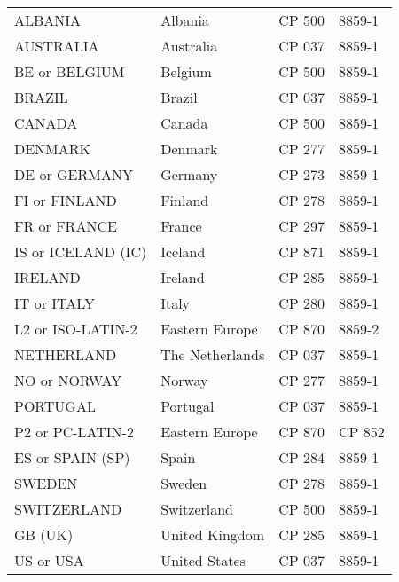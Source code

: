 \documentclass[letterpaper,10pt,english]{sphinxmanual}
\begin{document}
\begin{savenotes}\sphinxattablestart
\centering
\begin{tabulary}{\linewidth}[t]{|T|T|T|T|}
\hline
{}\relax &\relax &\relax &\relax \\
\hline
ALBANIA
&
Albania
&
CP 500
&
8859-1
\\
\hline
AUSTRALIA
&
Australia
&
CP 037
&
8859-1
\\
\hline
BE or BELGIUM
&
Belgium
&
CP 500
&
8859-1
\\
\hline
BRAZIL
&
Brazil
&
CP 037
&
8859-1
\\
\hline
CANADA
&
Canada
&
CP 500
&
8859-1
\\
\hline
DENMARK
&
Denmark
&
CP 277
&
8859-1
\\
\hline
DE or GERMANY
&
Germany
&
CP 273
&
8859-1
\\
\hline
FI or FINLAND
&
Finland
&
CP 278
&
8859-1
\\
\hline
FR or FRANCE
&
France
&
CP 297
&
8859-1
\\
\hline
IS or ICELAND (IC)
&
Iceland
&
CP 871
&
8859-1
\\
\hline
IRELAND
&
Ireland
&
CP 285
&
8859-1
\\
\hline
IT or ITALY
&
Italy
&
CP 280
&
8859-1
\\
\hline
L2 or ISO-LATIN-2
&
Eastern Europe
&
CP 870
&
8859-2
\\
\hline
NETHERLAND
&
The Netherlands
&
CP 037
&
8859-1
\\
\hline
NO or NORWAY
&
Norway
&
CP 277
&
8859-1
\\
\hline
PORTUGAL
&
Portugal
&
CP 037
&
8859-1
\\
\hline
P2 or PC-LATIN-2
&
Eastern Europe
&
CP 870
&
CP 852
\\
\hline
ES or SPAIN (SP)
&
Spain
&
CP 284
&
8859-1
\\
\hline
SWEDEN
&
Sweden
&
CP 278
&
8859-1
\\
\hline
SWITZERLAND
&
Switzerland
&
CP 500
&
8859-1
\\
\hline
GB (UK)
&
United Kingdom
&
CP 285
&
8859-1
\\
\hline
US or USA
&
United States
&
CP 037
&
8859-1
\\
\hline
\end{tabulary}
\par
\sphinxattableend\end{savenotes}
\end{document}
